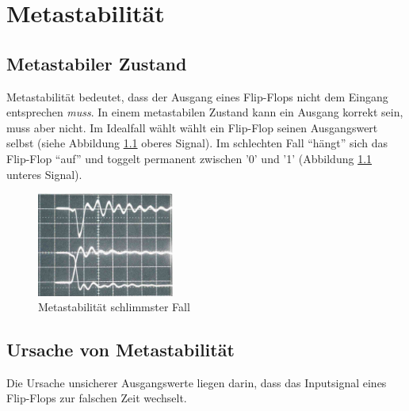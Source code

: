 
\chapter{Metastabilität}\label{chap.metastabilitat}

\section{Metastabiler Zustand}\label{sect.meatastabil_def}
Metastabilität bedeutet, dass der Ausgang eines Flip-Flops nicht dem Eingang entsprechen \textit{muss}. In einem metastabilen Zustand kann ein Ausgang korrekt sein, muss aber nicht.
Im Idealfall wählt wählt ein Flip-Flop seinen Ausgangswert selbst (siehe Abbildung \ref{fig.metastabil.schlimmster_Fall} oberes Signal). Im schlechten Fall “hängt” sich das Flip-Flop “auf” und toggelt permanent zwischen '0' und '1' (Abbildung \ref{fig.metastabil.schlimmster_Fall} unteres Signal).

\begin{figure}[H]
	\includegraphics[width=0.4\textwidth]{images/metastability/metastability_2_IO.png}
	\caption{Metastabilität schlimmster Fall \cite{F_metastability}}
	\label{fig.metastabil.schlimmster_Fall}
\end{figure}


\section{Ursache von Metastabilität}\label{sect.meatastabil_ursache}

Die Ursache unsicherer Ausgangswerte liegen darin, dass das Inputsignal eines Flip-Flops zur falschen Zeit wechselt.


